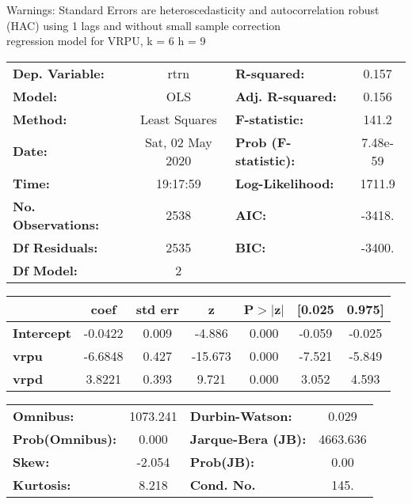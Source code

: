 Warnings: \newline
 [1] Standard Errors are heteroscedasticity and autocorrelation robust (HAC) using 1 lags and without small sample correction\\ 

regression model for VRPU, k = 6 h = 9\begin{center}
\begin{tabular}{lclc}
\toprule
\textbf{Dep. Variable:}    &       rtrn       & \textbf{  R-squared:         } &     0.157   \\
\textbf{Model:}            &       OLS        & \textbf{  Adj. R-squared:    } &     0.156   \\
\textbf{Method:}           &  Least Squares   & \textbf{  F-statistic:       } &     141.2   \\
\textbf{Date:}             & Sat, 02 May 2020 & \textbf{  Prob (F-statistic):} &  7.48e-59   \\
\textbf{Time:}             &     19:17:59     & \textbf{  Log-Likelihood:    } &    1711.9   \\
\textbf{No. Observations:} &        2538      & \textbf{  AIC:               } &    -3418.   \\
\textbf{Df Residuals:}     &        2535      & \textbf{  BIC:               } &    -3400.   \\
\textbf{Df Model:}         &           2      & \textbf{                     } &             \\
\bottomrule
\end{tabular}
\begin{tabular}{lcccccc}
                   & \textbf{coef} & \textbf{std err} & \textbf{z} & \textbf{P$> |$z$|$} & \textbf{[0.025} & \textbf{0.975]}  \\
\midrule
\textbf{Intercept} &      -0.0422  &        0.009     &    -4.886  &         0.000        &       -0.059    &       -0.025     \\
\textbf{vrpu}      &      -6.6848  &        0.427     &   -15.673  &         0.000        &       -7.521    &       -5.849     \\
\textbf{vrpd}      &       3.8221  &        0.393     &     9.721  &         0.000        &        3.052    &        4.593     \\
\bottomrule
\end{tabular}
\begin{tabular}{lclc}
\textbf{Omnibus:}       & 1073.241 & \textbf{  Durbin-Watson:     } &    0.029  \\
\textbf{Prob(Omnibus):} &   0.000  & \textbf{  Jarque-Bera (JB):  } & 4663.636  \\
\textbf{Skew:}          &  -2.054  & \textbf{  Prob(JB):          } &     0.00  \\
\textbf{Kurtosis:}      &   8.218  & \textbf{  Cond. No.          } &     145.  \\
\bottomrule
\end{tabular}
\end{center}


